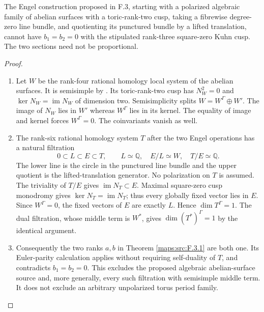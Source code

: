 \begin{theorem}\label{maps:src:F.3.4}


The Engel construction proposed in F.3, starting with a polarized
algebraic family of abelian surfaces with a toric-rank-two cusp,
taking a fibrewise degree-zero line bundle, and quotienting its
punctured bundle by a lifted translation, cannot have $b_1=b_2=0$
with the stipulated rank-three square-zero Kuhn cusp.
The two sections need not be proportional.

\end{theorem}


\begin{proof}
\begin{enumerate}[label=\arabic*.]
\item Let $W$ be the rank-four rational homology local system of the
abelian surfaces.  It is semisimple by
\cite[Definition 4.2.4 and Proposition 4.2.5, p.~44; Theorem 4.2.6, p.~45]{ffDeligne}.
Its toric-rank-two cusp has
$N_W^2=0$ and $\ker N_W=\operatorname{im}N_W$ of dimension two.
Semisimplicity splits $W=W^\Gamma\oplus W'$.
The image of $N_W$ lies in $W'$ whereas $W^\Gamma$ lies in its
kernel.  The equality of image and kernel forces $W^\Gamma=0$.
The coinvariants vanish as well.

\item The rank-six rational homology system $T$ after the two Engel
operations has a natural filtration
\[
 0\subset L\subset E\subset T,\qquad
 L\simeq\mathbb Q,\quad E/L\simeq W,\quad T/E\simeq\mathbb Q.
\]
The lower line is the circle in the punctured line bundle and
the upper quotient is the lifted-translation generator.
No polarization on $T$ is assumed.
The triviality of $T/E$ gives $\operatorname{im}N_T\subset E$.
Maximal square-zero cusp monodromy gives
$\ker N_T=\operatorname{im}N_T$; thus every globally fixed vector
lies in $E$.  Since $W^\Gamma=0$, the fixed vectors of $E$ are
exactly $L$.  Hence $\dim T^\Gamma=1$.
The dual filtration, whose middle term is $W^*$, gives
$\dim(T^*)^\Gamma=1$ by the identical argument.

\item Consequently the two ranks $a,b$ in Theorem \ref{maps:src:F.3.1} are both one.
Its Euler-parity calculation applies without requiring self-duality
of $T$, and contradicts $b_1=b_2=0$.
This excludes the proposed algebraic abelian-surface source and,
more generally, every such filtration with semisimple middle term.
It does not exclude an arbitrary unpolarized torus period family.

\end{enumerate}
\end{proof}




